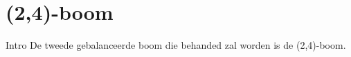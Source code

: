 \chapter{(2,4)-boom}
\label{sec:Hoofdstuk 5}

Intro
De tweede gebalanceerde boom die behanded zal worden is de (2,4)-boom. 

